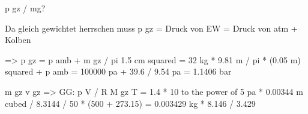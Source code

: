 p gz / mg? 

Da gleich gewichtet herrschen muss p gz = Druck von EW = Druck von atm + Kolben

=> p gz = p amb + m gz / pi 1.5 cm squared = 32 kg * 9.81 m / pi * (0.05 m) squared + p amb = 100000 pa + 39.6 / 9.54 pa = 1.1406 bar

m gz v gz => GG: p V / R M gz T = 1.4 * 10 to the power of 5 pa * 0.00344 m cubed / 8.3144 / 50 * (500 + 273.15) = 0.003429 kg * 8.146 / 3.429